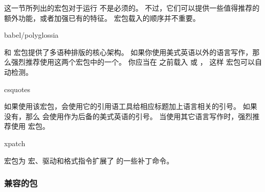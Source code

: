 这一节所列出的宏包对于运行 \biblatex 不是必须的。
不过，它们可以提供一些值得推荐的额外功能，或者加强已有的特征。
宏包载入的顺序并不重要。

\begin{marglist}

\item[babel/polyglossia]

 和  宏包提供了多语种排版的核心架构。
如果你使用美式英语以外的语言写作，那么强烈推荐使用这两个宏包中的一个。
你应当在 \biblatex 之前载入  或 ，
这样 \biblatex 宏包可以自动检测。

\item[csquotes]

如果使用该宏包，\biblatex 会使用它的引用语工具给相应标题加上语言相关的引号。
如果没有，那么 \biblatex 会使用作为后备的美式英语的引号。
当使用其它语言写作时，强烈推荐使用  宏包。

\item[xpatch]

 宏包为 \biblatex 宏、驱动和格式指令扩展了  的一些补丁命令。

\end{marglist}

\subsubsection{兼容的包}
\label{int:pre:cmp}


